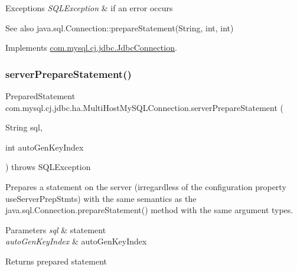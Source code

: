 \begin{DoxyExceptions}{Exceptions}
{\em S\+Q\+L\+Exception} & if an error occurs\\
\hline
\end{DoxyExceptions}
\begin{DoxySeeAlso}{See also}
java.\+sql.\+Connection\+::prepare\+Statement(\+String, int, int) 
\end{DoxySeeAlso}


Implements \mbox{\hyperlink{interfacecom_1_1mysql_1_1cj_1_1jdbc_1_1_jdbc_connection_aa0692efe53cb2eea133274bedbacd26a}{com.\+mysql.\+cj.\+jdbc.\+Jdbc\+Connection}}.

\mbox{\label{classcom_1_1mysql_1_1cj_1_1jdbc_1_1ha_1_1_multi_host_my_s_q_l_connection_a26a0ffb4b44f358479e5a39a3241837f}} 
\subsubsection{\texorpdfstring{server\+Prepare\+Statement()}{serverPrepareStatement()}\hspace{0.1cm}{\footnotesize\ttfamily [3/6]}}
{\footnotesize\ttfamily Prepared\+Statement com.\+mysql.\+cj.\+jdbc.\+ha.\+Multi\+Host\+My\+S\+Q\+L\+Connection.\+server\+Prepare\+Statement (\begin{DoxyParamCaption}\item[{String}]{sql,  }\item[{int}]{auto\+Gen\+Key\+Index }\end{DoxyParamCaption}) throws S\+Q\+L\+Exception}

Prepares a statement on the server (irregardless of the configuration property \textquotesingle{}use\+Server\+Prep\+Stmts\textquotesingle{}) with the same semantics as the java.\+sql.\+Connection.\+prepare\+Statement() method with the same argument types.


\begin{DoxyParams}{Parameters}
{\em sql} & statement \\
\hline
{\em auto\+Gen\+Key\+Index} & auto\+Gen\+Key\+Index \\
\hline
\end{DoxyParams}
\begin{DoxyReturn}{Returns}
prepared statement 
\end{DoxyReturn}

